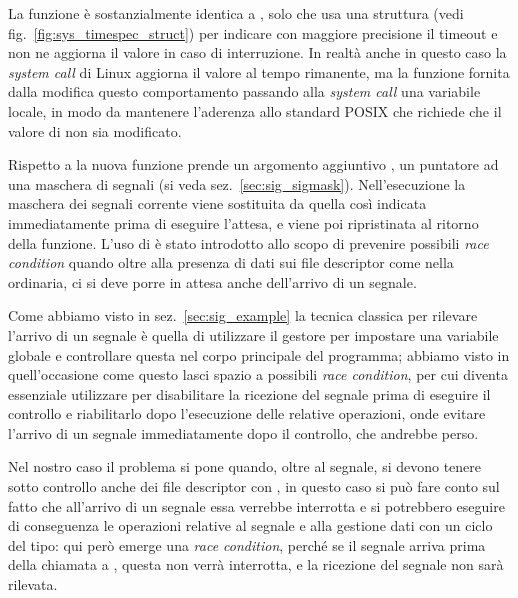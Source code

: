 La funzione è sostanzialmente identica a , solo che usa una
struttura  (vedi fig.~\ref{fig:sys_timespec_struct}) per
indicare con maggiore precisione il timeout e non ne aggiorna il valore in
caso di interruzione. In realtà anche in questo caso la \textit{system call}
di Linux aggiorna il valore al tempo rimanente, ma la funzione fornita dalla
 modifica questo comportamento passando alla \textit{system call}
una variabile locale, in modo da mantenere l'aderenza allo standard POSIX che
richiede che il valore di  non sia modificato. 

Rispetto a  la nuova funzione prende un argomento
aggiuntivo , un puntatore ad una maschera di segnali (si veda
sez.~\ref{sec:sig_sigmask}).  Nell'esecuzione la maschera dei segnali corrente
viene sostituita da quella così indicata immediatamente prima di eseguire
l'attesa, e viene poi ripristinata al ritorno della funzione. L'uso
di  è stato introdotto allo scopo di prevenire possibili
\textit{race condition} quando oltre alla presenza di dati sui file descriptor
come nella  ordinaria, ci si deve porre in attesa anche
dell'arrivo di un segnale.

Come abbiamo visto in sez.~\ref{sec:sig_example} la tecnica classica per
rilevare l'arrivo di un segnale è quella di utilizzare il gestore per
impostare una variabile globale e controllare questa nel corpo principale del
programma; abbiamo visto in quell'occasione come questo lasci spazio a
possibili \textit{race condition}, per cui diventa essenziale utilizzare
 per disabilitare la ricezione del segnale prima di eseguire
il controllo e riabilitarlo dopo l'esecuzione delle relative operazioni, onde
evitare l'arrivo di un segnale immediatamente dopo il controllo, che andrebbe
perso.

Nel nostro caso il problema si pone quando, oltre al segnale, si devono tenere
sotto controllo anche dei file descriptor con , in questo caso si
può fare conto sul fatto che all'arrivo di un segnale essa verrebbe interrotta
e si potrebbero eseguire di conseguenza le operazioni relative al segnale e
alla gestione dati con un ciclo del tipo:
qui però emerge una \textit{race condition}, perché se il segnale arriva prima
della chiamata a , questa non verrà interrotta, e la ricezione
del segnale non sarà rilevata.

